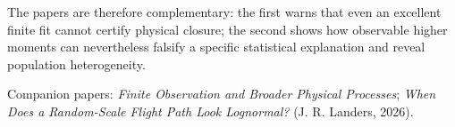 \documentclass[10pt]{article}
\begin{document}
\noindent{}

\vspace{4pt}
The papers are therefore complementary: the first warns that even an excellent finite fit cannot certify physical closure; the second shows how observable higher moments can nevertheless falsify a specific statistical explanation and reveal population heterogeneity.

\vfill
{\footnotesize\color{DeepBlue}
Companion papers: \emph{Finite Observation and Broader Physical Processes};
\emph{When Does a Random-Scale Flight Path Look Lognormal?} (J. R. Landers, 2026).}
\end{document}
